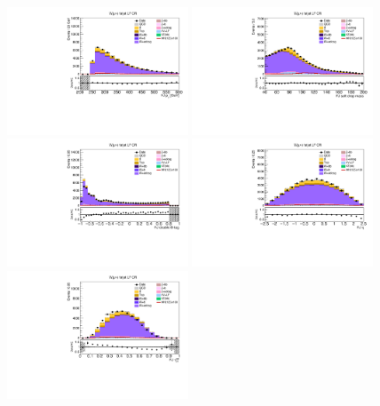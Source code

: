 \begin{figure}[tbp]
  \begin{center}
    \includegraphics[width=0.48\textwidth]{figures/wlnhbb2016/boosted/WmnWHLightFlavorFJCR_fj1Pt.pdf}
    \includegraphics[width=0.48\textwidth]{figures/wlnhbb2016/boosted/WmnWHLightFlavorFJCR_fj1MSD_corr.pdf}
    \includegraphics[width=0.48\textwidth]{figures/wlnhbb2016/boosted/WmnWHLightFlavorFJCR_fj1DoubleCSV.pdf}
    \includegraphics[width=0.48\textwidth]{figures/wlnhbb2016/boosted/WmnWHLightFlavorFJCR_fj1Eta.pdf}
    \includegraphics[width=0.48\textwidth]{figures/wlnhbb2016/boosted/WmnWHLightFlavorFJCR_fj1Tau21SD.pdf}

\end{center}
\end{figure}
